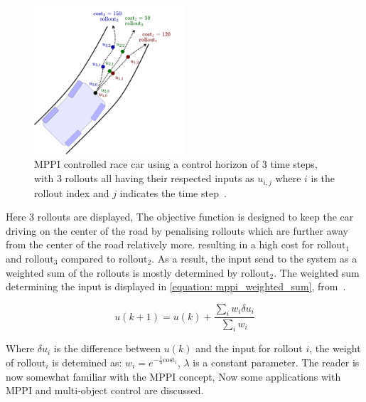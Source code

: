 \begin{figure}[h]
    \centering
    \includegraphics[width=0.5\textwidth]{figures/MPPI_car_with_rollouts.png}
    \caption{\acs{MPPI} controlled race car using a control horizon of 3 time steps, with 3 rollouts all having their respected inputs as $u_{i,j}$ where $i$ is the rollout index and $j$ indicates the time step~\cite{neuromorphictutorial_ltc21_2021}.}
    \label{figure: mppi_car_with_rollouts}
\end{figure}

Here 3 rollouts are displayed, The objective function is designed to keep the car driving on the center of the road by penalising rollouts which are further away from the center of the road relatively more. resulting in a high cost for $\text{rollout}_1$ and $\text{rollout}_3$ compared to $\text{rollout}_2$. As a result, the input send to the system as a weighted sum of the rollouts is mostly determined by $\text{rollout}_2$. The weighted sum determining the input is displayed in \cref{equation: mppi_weighted_sum}, from~\cite{neuromorphictutorial_ltc21_2021}.

\begin{equation}
u(k+1)=u(k)+\frac{\sum_{i} w_{i} \delta u_{i}}{\sum_{i} w_{i}}
\label{equation: mppi_weighted_sum}
\end{equation}

Where $\delta u_i$ is the difference between $u(k)$ and the input for rollout $i$, the weight of $\text{rollout}_i$ is detemined as: $w_{i}=e^{-\frac{1}{\lambda} \text{cost}_{i}}$, $\lambda$ is a constant parameter. The reader is now somewhat familiar with the \ac{MPPI} concept, Now some applications with \ac{MPPI} and multi-object control are discussed.\\
